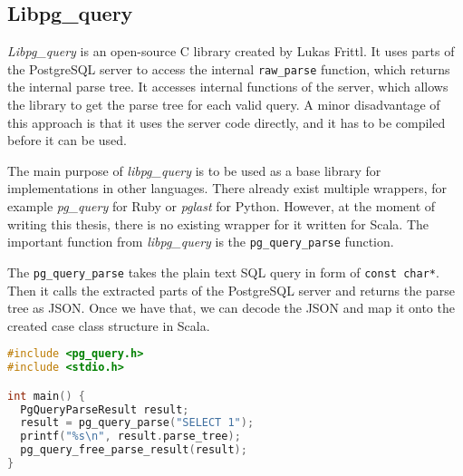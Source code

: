 \subsection{Libpg\_query}
\textit{Libpg\_query} is an open-source C library created by Lukas Frittl. It uses parts of the PostgreSQL server to access the internal \texttt{raw\_parse} function, which returns the internal parse tree. It accesses internal functions of the server, which allows the library to get the parse tree for each valid query. A minor disadvantage of this approach is that it uses the server code directly, and it has to be compiled before it can be used.

The main purpose of \textit{libpg\_query} is to be used as a base library for implementations in other languages. There already exist multiple wrappers, for example \textit{pg\_query} for Ruby or \textit{pglast} for Python. However, at the moment of writing this thesis, there is no existing wrapper for it written for Scala. The important function from \textit{libpg\_query} is the \texttt{pg\_query\_parse} function.

The \texttt{pg\_query\_parse} takes the plain text SQL query in form of \texttt{const char*}. Then it calls the extracted parts of the PostgreSQL server and returns the parse tree as JSON. Once we have that, we can decode the JSON and map it onto the created case class structure in Scala.

\begin{lstlisting}[language=C, basicstyle=\ttfamily, keywordstyle=\color{purple}, showstringspaces=false, caption={\texttt{Libpg\_query usage example} \cite{libpgquery}}]
#include <pg_query.h>
#include <stdio.h>

int main() {
  PgQueryParseResult result;
  result = pg_query_parse("SELECT 1");
  printf("%s\n", result.parse_tree);
  pg_query_free_parse_result(result);
}
\end{lstlisting}